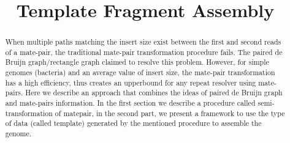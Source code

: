 \documentclass[12pt,a4paper,oneside]{article}
\title{Template Fragment Assembly}
\begin{document}
\maketitle

\begin{abstract}
When multiple paths matching the insert size  exist between the first and second reads of a mate-pair,
 the traditional mate-pair transformation procedure fails. The paired de Bruijn graph/rectangle graph claimed to resolve this problem. However, for simple genomes (bacteria) and 
an average value of insert size, the mate-pair transformation has a high efficiency, thus creates an upperbound for any repeat resolver using mate-pairs. Here we describe 
 an approach that combines the ideas of paired de Bruijn graph and mate-pairs information. In the first section we 
 describe a procedure called semi-transformation of matepair, in the second part, we present a framework to use the type of data (called template) generated by the mentioned procedure  to assemble the genome. 
\end{abstract}
\end{document}
